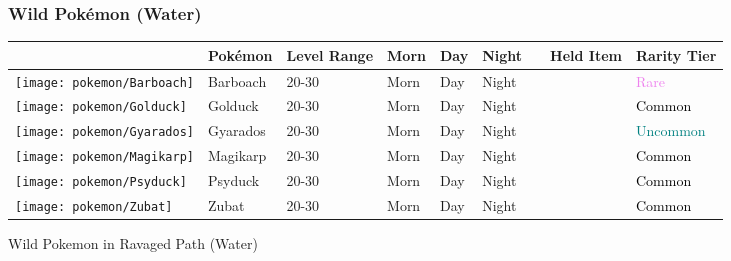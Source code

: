 \subsubsection{Wild Pokémon (Water)}%
\label{ssubsec:WildPokmon(Water)}%
\begin{longtable}{||l l l l l l l l l||}%
\hline%
&Pokémon&Level Range&Morn&Day&Night&&Held Item&Rarity Tier\\%
\hline%
\endhead%
\hline%
\texttt{[image: pokemon/Barboach]}&Barboach&20{-}30&Morn&Day&Night&&&\textcolor{violet}{%
Rare%
}\\%
\hline%
\texttt{[image: pokemon/Golduck]}&Golduck&20{-}30&Morn&Day&Night&&&\textcolor{black}{%
Common%
}\\%
\hline%
\texttt{[image: pokemon/Gyarados]}&Gyarados&20{-}30&Morn&Day&Night&&&\textcolor{teal}{%
Uncommon%
}\\%
\hline%
\texttt{[image: pokemon/Magikarp]}&Magikarp&20{-}30&Morn&Day&Night&&&\textcolor{black}{%
Common%
}\\%
\hline%
\texttt{[image: pokemon/Psyduck]}&Psyduck&20{-}30&Morn&Day&Night&&&\textcolor{black}{%
Common%
}\\%
\hline%
\texttt{[image: pokemon/Zubat]}&Zubat&20{-}30&Morn&Day&Night&&&\textcolor{black}{%
Common%
}\\%
\hline%
\end{longtable}%
\caption{Wild Pokemon in Ravaged Path (Water)}
